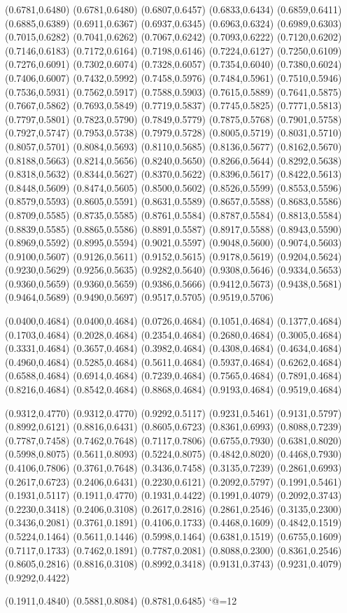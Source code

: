 \PST@ThickBorder(0.6781,0.6480)
(0.6781,0.6480)
(0.6807,0.6457)
(0.6833,0.6434)
(0.6859,0.6411)
(0.6885,0.6389)
(0.6911,0.6367)
(0.6937,0.6345)
(0.6963,0.6324)
(0.6989,0.6303)
(0.7015,0.6282)
(0.7041,0.6262)
(0.7067,0.6242)
(0.7093,0.6222)
(0.7120,0.6202)
(0.7146,0.6183)
(0.7172,0.6164)
(0.7198,0.6146)
(0.7224,0.6127)
(0.7250,0.6109)
(0.7276,0.6091)
(0.7302,0.6074)
(0.7328,0.6057)
(0.7354,0.6040)
(0.7380,0.6024)
(0.7406,0.6007)
(0.7432,0.5992)
(0.7458,0.5976)
(0.7484,0.5961)
(0.7510,0.5946)
(0.7536,0.5931)
(0.7562,0.5917)
(0.7588,0.5903)
(0.7615,0.5889)
(0.7641,0.5875)
(0.7667,0.5862)
(0.7693,0.5849)
(0.7719,0.5837)
(0.7745,0.5825)
(0.7771,0.5813)
(0.7797,0.5801)
(0.7823,0.5790)
(0.7849,0.5779)
(0.7875,0.5768)
(0.7901,0.5758)
(0.7927,0.5747)
(0.7953,0.5738)
(0.7979,0.5728)
(0.8005,0.5719)
(0.8031,0.5710)
(0.8057,0.5701)
(0.8084,0.5693)
(0.8110,0.5685)
(0.8136,0.5677)
(0.8162,0.5670)
(0.8188,0.5663)
(0.8214,0.5656)
(0.8240,0.5650)
(0.8266,0.5644)
(0.8292,0.5638)
(0.8318,0.5632)
(0.8344,0.5627)
(0.8370,0.5622)
(0.8396,0.5617)
(0.8422,0.5613)
(0.8448,0.5609)
(0.8474,0.5605)
(0.8500,0.5602)
(0.8526,0.5599)
(0.8553,0.5596)
(0.8579,0.5593)
(0.8605,0.5591)
(0.8631,0.5589)
(0.8657,0.5588)
(0.8683,0.5586)
(0.8709,0.5585)
(0.8735,0.5585)
(0.8761,0.5584)
(0.8787,0.5584)
(0.8813,0.5584)
(0.8839,0.5585)
(0.8865,0.5586)
(0.8891,0.5587)
(0.8917,0.5588)
(0.8943,0.5590)
(0.8969,0.5592)
(0.8995,0.5594)
(0.9021,0.5597)
(0.9048,0.5600)
(0.9074,0.5603)
(0.9100,0.5607)
(0.9126,0.5611)
(0.9152,0.5615)
(0.9178,0.5619)
(0.9204,0.5624)
(0.9230,0.5629)
(0.9256,0.5635)
(0.9282,0.5640)
(0.9308,0.5646)
(0.9334,0.5653)
(0.9360,0.5659)
\PST@ThickBorder(0.9360,0.5659)
(0.9386,0.5666)
(0.9412,0.5673)
(0.9438,0.5681)
(0.9464,0.5689)
(0.9490,0.5697)
(0.9517,0.5705)
(0.9519,0.5706)

\PST@Border(0.0400,0.4684)
(0.0400,0.4684)
(0.0726,0.4684)
(0.1051,0.4684)
(0.1377,0.4684)
(0.1703,0.4684)
(0.2028,0.4684)
(0.2354,0.4684)
(0.2680,0.4684)
(0.3005,0.4684)
(0.3331,0.4684)
(0.3657,0.4684)
(0.3982,0.4684)
(0.4308,0.4684)
(0.4634,0.4684)
(0.4960,0.4684)
(0.5285,0.4684)
(0.5611,0.4684)
(0.5937,0.4684)
(0.6262,0.4684)
(0.6588,0.4684)
(0.6914,0.4684)
(0.7239,0.4684)
(0.7565,0.4684)
(0.7891,0.4684)
(0.8216,0.4684)
(0.8542,0.4684)
(0.8868,0.4684)
(0.9193,0.4684)
(0.9519,0.4684)

\PST@Dashed(0.9312,0.4770)
(0.9312,0.4770)
(0.9292,0.5117)
(0.9231,0.5461)
(0.9131,0.5797)
(0.8992,0.6121)
(0.8816,0.6431)
(0.8605,0.6723)
(0.8361,0.6993)
(0.8088,0.7239)
(0.7787,0.7458)
(0.7462,0.7648)
(0.7117,0.7806)
(0.6755,0.7930)
(0.6381,0.8020)
(0.5998,0.8075)
(0.5611,0.8093)
(0.5224,0.8075)
(0.4842,0.8020)
(0.4468,0.7930)
(0.4106,0.7806)
(0.3761,0.7648)
(0.3436,0.7458)
(0.3135,0.7239)
(0.2861,0.6993)
(0.2617,0.6723)
(0.2406,0.6431)
(0.2230,0.6121)
(0.2092,0.5797)
(0.1991,0.5461)
(0.1931,0.5117)
(0.1911,0.4770)
(0.1931,0.4422)
(0.1991,0.4079)
(0.2092,0.3743)
(0.2230,0.3418)
(0.2406,0.3108)
(0.2617,0.2816)
(0.2861,0.2546)
(0.3135,0.2300)
(0.3436,0.2081)
(0.3761,0.1891)
(0.4106,0.1733)
(0.4468,0.1609)
(0.4842,0.1519)
(0.5224,0.1464)
(0.5611,0.1446)
(0.5998,0.1464)
(0.6381,0.1519)
(0.6755,0.1609)
(0.7117,0.1733)
(0.7462,0.1891)
(0.7787,0.2081)
(0.8088,0.2300)
(0.8361,0.2546)
(0.8605,0.2816)
(0.8816,0.3108)
(0.8992,0.3418)
(0.9131,0.3743)
(0.9231,0.4079)
(0.9292,0.4422)

\PST@Fillcircle(0.1911,0.4840)
\PST@Fillcircle(0.5881,0.8084)
\PST@Fillcircle(0.8781,0.6485)
\catcode`@=12
\fi
\endpspicture
